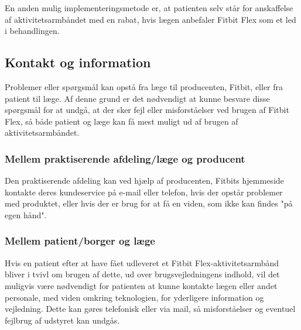 En anden mulig implementeringsmetode er, at patienten selv står for anskaffelse af aktivitetsarmbåndet med en rabat, hvis lægen anbefaler Fitbit Flex som et led i behandlingen.  

\subsection{Kontakt og information}

Problemer eller spørgsmål kan opstå fra læge til producenten, Fitbit, eller fra patient til læge. Af denne grund er det nødvendigt at kunne besvare disse spørgsmål for at undgå, at der sker fejl eller misforståelser ved brugen af Fitbit Flex, så både patient og læge kan få mest muligt ud af brugen af aktivitetsarmbåndet. 

\subsubsection{Mellem praktiserende afdeling/læge og producent}

Den praktiserende afdeling kan ved hjælp af producenten, Fitbits hjemmeside kontakte deres kundeservice på e-mail eller telefon, hvis der opstår problemer med produktet, eller hvis der er brug for at få en viden, som ikke kan findes "på egen hånd". 

\subsubsection{Mellem patient/borger og læge}

Hvis en patient efter at have fået udleveret et Fitbit Flex-aktivitetsarmbånd bliver i tvivl om brugen af dette, ud over brugsvejledningens indhold, vil det muligvis være nødvendigt for patienten at kunne kontakte lægen eller andet personale, med viden omkring teknologien, for yderligere information og vejledning. Dette kan gøres telefonisk eller via mail, så misforståelser og eventuel fejlbrug af udstyret kan undgås. 


